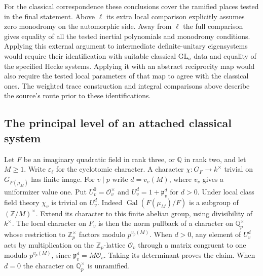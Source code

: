 For the classical correspondence these conclusions cover the ramified
places tested in the final statement. Above $\ell$ its extra local
comparison explicitly assumes zero monodromy on the automorphic side.
Away from $\ell$ the full comparison gives equality of all the tested
inertial polynomials and monodromy conditions. Applying this external
argument to intermediate definite-unitary eigensystems would require
their identification with suitable classical $\mathrm{GL}_a$ data and
equality of the specified Hecke systems. Applying it with an abstract
reciprocity map would also require the tested local parameters of that
map to agree with the classical ones. The weighted trace construction
and integral comparisons above describe the source's route prior to
these identifications.

\subsection{The principal level of an attached classical system}

Let $F$ be an imaginary quadratic field in rank three, or $\mathbb Q$ in
rank two, and let $M\ge1$. Write $\varepsilon_\ell$ for the cyclotomic
character. A character $\chi:G_F\to k^\times$ trivial on
$G_{F(\mu_M)}$ has finite image. For $v\mid p$ write $d=v_v(M)$,
where $v_v$ gives a uniformizer value one. Put
$U_v^0=\mathcal O_v^\times$ and $U_v^d=1+\mathfrak p_v^d$ for $d>0$.
Under local class field theory $\chi_v$ is trivial on $U_v^d$.
Indeed $\operatorname{Gal}(F(\mu_M)/F)$ is a subgroup of
$(\mathbb Z/M)^\times$. Extend its character to this finite abelian
group, using divisibility of $k^\times$. The local character on $F_v$
is then the norm pullback of a character on $\mathbb Q_p^\times$ whose
restriction to $\mathbb Z_p^\times$ factors modulo $p^{v_p(M)}$.
When $d>0$, any element of $U_v^d$ acts by multiplication on the
$\mathbb Z_p$-lattice $\mathcal O_v$ through a matrix congruent to
one modulo $p^{v_p(M)}$, since $\mathfrak p_v^d=M\mathcal O_v$.
Taking its determinant proves the claim. When $d=0$ the character
on $\mathbb Q_p^\times$ is unramified.

